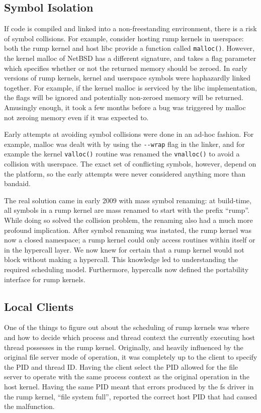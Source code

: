 \subsection{Symbol Isolation}

If code is compiled and linked into a non-freestanding environment, there is a
risk of symbol collisions.  For example, consider hosting rump kernels in
userspace: both the rump kernel and host libc
provide a function called \verb+malloc()+.  However, the kernel malloc
of NetBSD has a different signature, and takes \eg a flag parameter
which specifies whether or not the returned memory should be zeroed.
In early versions of rump kernels, kernel and userspace symbols
were haphazardly linked together.  For example, if the kernel malloc
is serviced by the libc implementation, the flags will be ignored and
potentially non-zeroed memory will be returned.  Amusingly enough,
it took a few months before a bug was triggered by malloc not zeroing
memory even if it was expected to.

Early attempts at avoiding symbol collisions were done in an ad-hoc
fashion.  For example, malloc was dealt with by using the \verb+--wrap+
flag in the linker, and for example the kernel \verb+valloc()+ routine
was renamed the \verb+vnalloc()+ to avoid a collision with userspace.
The exact set of conflicting symbols, however, depend on the platform,
so the early attempts were never considered anything more than bandaid.

The real solution came in early 2009 with mass symbol renaming:
at build-time, all symbols in a rump kernel are mass renamed to start
with the prefix ``rump''.  While doing so solved the collision problem,
the renaming also had a much more profound implication.  After symbol
renaming was instated, the rump kernel was now a closed namespace; a rump
kernel could only access routines within itself or in the hypercall layer.
We now knew for certain that a rump kernel would not block without making
a hypercall.  This knowledge led to understanding the required scheduling
model.  Furthermore, hypercalls now defined the portability interface
for rump kernels.


\subsection{Local Clients}

One of the things to figure out about the scheduling of rump kernels was
where and how to decide which process and thread context the currently
executing host thread possesses in the rump kernel.  Originally, and
heavily influenced by the original file server mode of operation, it was
completely up to the client to specify the PID and thread ID.  Having the
client select the PID allowed for the file server to operate with the
same process context as the original operation in the host kernel.
Having the same PID meant that errors produced by the fs driver in the
rump kernel, \eg ``file system full'', reported the correct host PID
that had caused the malfunction.

